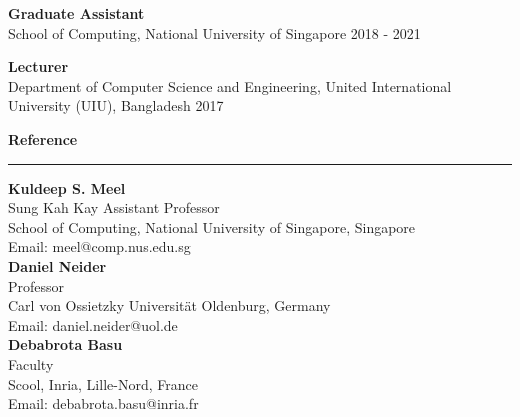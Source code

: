 \documentclass[a4paper,10pt,final]{article}
\newcommand{\Sep}{\vspace{1.5em}}
\newcommand{\SmallSep}{\vspace{0.5em}}
\begin{document}
\SmallSep
\textbf{Graduate Assistant}\\
School of Computing, National University of Singapore \hspace*{\fill} 2018  - 2021

\SmallSep
\textbf{Lecturer}\\
Department of Computer Science and Engineering, United International University (UIU), Bangladesh \hspace*{\fill} 2017


\Sep
\Large{\textbf{Reference}}\\
\noindent\rule{\textwidth}{1pt}
\normalsize
\textbf{Kuldeep S. Meel}\\
Sung Kah Kay Assistant Professor\\ 
School of Computing, National University of Singapore, Singapore\\
Email: meel@comp.nus.edu.sg\\

\textbf{Daniel Neider}\\
Professor\\
Carl von Ossietzky Universit\"at Oldenburg, Germany\\
Email: daniel.neider@uol.de\\

\textbf{Debabrota Basu}\\
Faculty\\
Scool, Inria, Lille-Nord, France\\
Email: debabrota.basu@inria.fr\\
\end{document}
